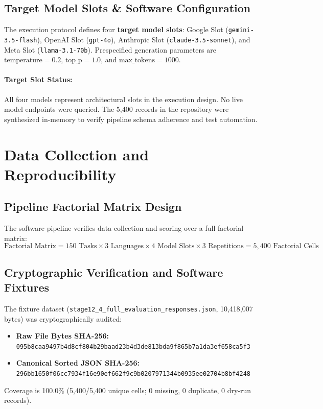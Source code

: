 \documentclass[11pt,a4paper]{article}
\begin{document}
\subsection{Target Model Slots \& Software Configuration}
\label{sec:model_slots}

The execution protocol defines four \textbf{target model slots}:
Google Slot (\texttt{gemini-3.5-flash}), OpenAI Slot (\texttt{gpt-4o}), Anthropic Slot (\texttt{claude-3.5-sonnet}), and Meta Slot (\texttt{llama-3.1-70b}). Prespecified generation parameters are $\text{temperature} = 0.2$, $\text{top\_p} = 1.0$, and $\text{max\_tokens} = 1000$.

\paragraph{Target Slot Status:} All four models represent architectural slots in the execution design. No live model endpoints were queried. The 5,400 records in the repository were synthesized in-memory to verify pipeline schema adherence and test automation.

\section{Data Collection and Reproducibility}
\label{sec:data_collection}

\subsection{Pipeline Factorial Matrix Design}
\label{sec:matrix_design}

The software pipeline verifies data collection and scoring over a full factorial matrix:
\begin{equation}
\label{eq:factorial}
\text{Factorial Matrix} = 150 \text{ Tasks} \times 3 \text{ Languages} \times 4 \text{ Model Slots} \times 3 \text{ Repetitions} = 5{,}400 \text{ Factorial Cells}
\end{equation}

\subsection{Cryptographic Verification and Software Fixtures}
\label{sec:crypto_integrity}

The fixture dataset (\texttt{stage12\_4\_full\_evaluation\_responses.json}, 10,418,007 bytes) was cryptographically audited:
\begin{itemize}
  \item \textbf{Raw File Bytes SHA-256:} \texttt{095b8caa9497b4d8cf804b29baad23b4d3de813bda9f865b7a1da3ef658ca5f3}
  \item \textbf{Canonical Sorted JSON SHA-256:} \texttt{296bb1650f06cc7934f16e90ef662f9c9b0207971344b0935ee02704b8bf4248}
\end{itemize}
Coverage is 100.0\% (5,400/5,400 unique cells; 0 missing, 0 duplicate, 0 dry-run records).
\end{document}
